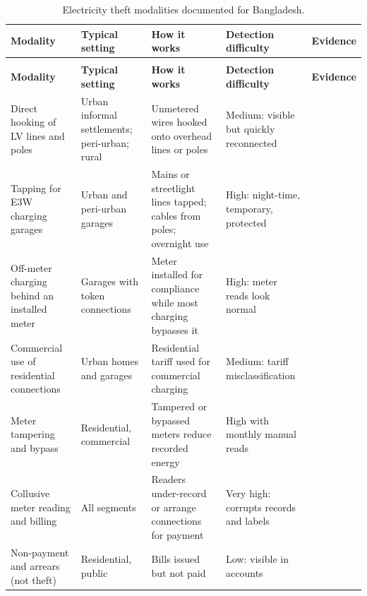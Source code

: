\begingroup
\footnotesize
\renewcommand{\arraystretch}{1.12}
\setlength{\tabcolsep}{3pt}
\begin{xltabular}{\textwidth}{>{\raggedright\arraybackslash{}\hsize}X>{\raggedright\arraybackslash{}\hsize}X>{\raggedright\arraybackslash{}\hsize}X>{\raggedright\arraybackslash{}\hsize}X>{\raggedright\arraybackslash{}\hsize}X}
\caption{Electricity theft modalities documented for Bangladesh.}\label{tab:t3} \\
\toprule
\textbf{Modality} & \textbf{Typical setting} & \textbf{How it works} & \textbf{Detection difficulty} & \textbf{Evidence} \\
\midrule
\endfirsthead
{} \\
\toprule
\textbf{Modality} & \textbf{Typical setting} & \textbf{How it works} & \textbf{Detection difficulty} & \textbf{Evidence} \\
\midrule
\endhead
\bottomrule
\endlastfoot
Direct hooking of LV lines and poles & Urban informal settlements; peri-urban; rural & Unmetered wires hooked onto overhead lines or poles & Medium: visible but quickly reconnected & \citealp{hossain2024transmission,sayem2020reducing,lovei2000costs} \\
Tapping for E3W charging garages & Urban and peri-urban garages & Mains or streetlight lines tapped; cables from poles; overnight use & High: night-time, temporary, protected & \citealp{islam2025banglatesla,bonikbarta2026battery,mahmud2025integrating} \\
Off-meter charging behind an installed meter & Garages with token connections & Meter installed for compliance while most charging bypasses it & High: meter reads look normal & \citealp{islam2025banglatesla} \\
Commercial use of residential connections & Urban homes and garages & Residential tariff used for commercial charging & Medium: tariff misclassification & \citealp{tbs2026illegal,islam2025banglatesla,mahmud2025integrating} \\
Meter tampering and bypass & Residential, commercial & Tampered or bypassed meters reduce recorded energy & High with monthly manual reads & \citealp{bss2025dpdc,bss2025pdb} \\
Collusive meter reading and billing & All segments & Readers under-record or arrange connections for payment & Very high: corrupts records and labels & \citealp{lovei2000costs,hossain2024transmission,islam2025banglatesla} \\
Non-payment and arrears (not theft) & Residential, public & Bills issued but not paid & Low: visible in accounts & \citealp{adb2003cost} \\
\end{xltabular}
\endgroup
